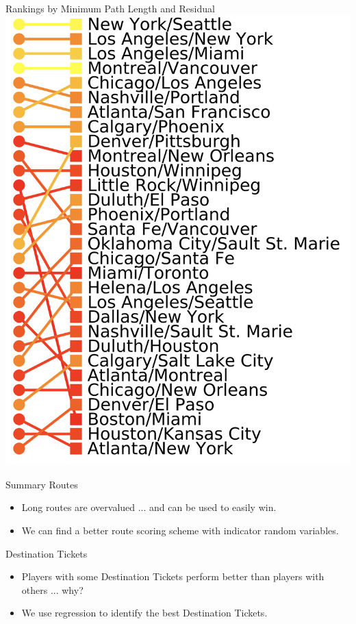 \documentclass[12pt]{beamer}
\begin{document}
\begin{frame}{Rankings by Minimum Path Length and Residual}
    \centering
    \includegraphics[scale=.2]{figures/rankings}
\end{frame}

\begin{frame}{Summary}
    Routes
    \begin{itemize}
        \item Long routes are overvalued ... and can 
        be used to easily win.
        \item We can find a better route scoring scheme 
        with indicator random variables.
    \end{itemize}
    
    Destination Tickets
    \begin{itemize}
        \item Players with some Destination Tickets perform
        better than players with others ... why?
        \item We use regression to identify
        the best Destination Tickets.
    \end{itemize}
    
\end{frame}
\end{document}

